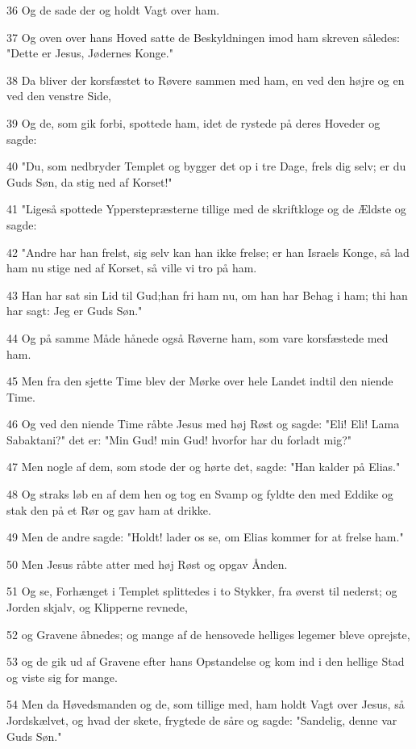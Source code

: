 \par 36 Og de sade der og holdt Vagt over ham.
\par 37 Og oven over hans Hoved satte de Beskyldningen imod ham skreven således: "Dette er Jesus, Jødernes Konge."
\par 38 Da bliver der korsfæstet to Røvere sammen med ham, en ved den højre og en ved den venstre Side,
\par 39 Og de, som gik forbi, spottede ham, idet de rystede på deres Hoveder og sagde:
\par 40 "Du, som nedbryder Templet og bygger det op i tre Dage, frels dig selv; er du Guds Søn, da stig ned af Korset!"
\par 41 "Ligeså spottede Ypperstepræsterne tillige med de skriftkloge og de Ældste og sagde:
\par 42 "Andre har han frelst, sig selv kan han ikke frelse; er han Israels Konge, så lad ham nu stige ned af Korset, så ville vi tro på ham.
\par 43 Han har sat sin Lid til Gud;han fri ham nu, om han har Behag i ham; thi han har sagt: Jeg er Guds Søn."
\par 44 Og på samme Måde hånede også Røverne ham, som vare korsfæstede med ham.
\par 45 Men fra den sjette Time blev der Mørke over hele Landet indtil den niende Time.
\par 46 Og ved den niende Time råbte Jesus med høj Røst og sagde: "Eli! Eli! Lama Sabaktani?" det er: "Min Gud! min Gud! hvorfor har du forladt mig?"
\par 47 Men nogle af dem, som stode der og hørte det, sagde: "Han kalder på Elias."
\par 48 Og straks løb en af dem hen og tog en Svamp og fyldte den med Eddike og stak den på et Rør og gav ham at drikke.
\par 49 Men de andre sagde: "Holdt! lader os se, om Elias kommer for at frelse ham."
\par 50 Men Jesus råbte atter med høj Røst og opgav Ånden.
\par 51 Og se, Forhænget i Templet splittedes i to Stykker, fra øverst til nederst; og Jorden skjalv, og Klipperne revnede,
\par 52 og Gravene åbnedes; og mange af de hensovede helliges legemer bleve oprejste,
\par 53 og de gik ud af Gravene efter hans Opstandelse og kom ind i den hellige Stad og viste sig for mange.
\par 54 Men da Høvedsmanden og de, som tillige med, ham holdt Vagt over Jesus, så Jordskælvet, og hvad der skete, frygtede de såre og sagde: "Sandelig, denne var Guds Søn."
